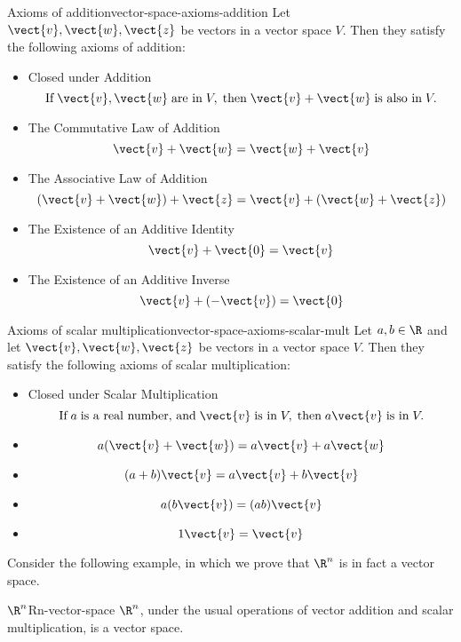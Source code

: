 \begin{definition}{Axioms of addition}{vector-space-axioms-addition}
Let $\vect{v}, \vect{w}, \vect{z}$ be vectors in a vector space $V$. Then they satisfy the following axioms of addition:

\begin{itemize}
\item Closed under Addition
\[ \mbox{If}\; \vect{v}, \vect{w} \;\mbox{are in}\; V, \;\mbox{then}\; \vect{v}+\vect{w} \;\mbox{is also in}\; V.
\] 
\item The Commutative Law of Addition
\[
\vect{v}+\vect{w}=\vect{w}+\vect{v}
\]
\item The Associative Law of Addition
\[
(\vect{v}+\vect{w}) +\vect{z}=\vect{v}+(\vect{w}+
\vect{z}) 
\]
\item The Existence of an Additive Identity
\[
\vect{v}+\vect{0}=\vect{v}
\]
\item The Existence of an Additive Inverse
\[
\vect{v}+(-\vect{v}) =\vect{0}
\]
\end{itemize}
\end{definition}

\begin{definition}{Axioms of scalar multiplication}{vector-space-axioms-scalar-mult}
Let $a, b \in \R$ and let $\vect{v}, \vect{w}, \vect{z}$ be vectors in a vector space $V$. Then they satisfy the following axioms of scalar multiplication:

\begin{itemize}
\item Closed under Scalar Multiplication
\[ \mbox{If}\; a \;\mbox{is a real number, and}\; \vect{v} \;\mbox{is in}\; V, \;\mbox{then}\; a\vect{v} \;\mbox{is in}\; V.
\]
\item
\[
a (\vect{v}+\vect{w}) = a \vect{v}+ a \vect{w}  \label{e.01}
\]
\item
\[
(a + b) \vect{v}= a \vect{v}+ b \vect{v}
\label{e.02}
\]
\item
\[
a (b \vect{v}) = (a b) \vect{v}
\label{e.03}
\]
\item
\[
1\vect{v}=\vect{v}  \label{e.04}
\]
\end{itemize}
\end{definition}

Consider the following example, in which we prove that $\R^n$ is in fact a vector space.

\begin{example}{$\R^n$}{Rn-vector-space}
$\R^n$, under the usual operations of vector addition and scalar multiplication, is a vector space.
\end{example}

